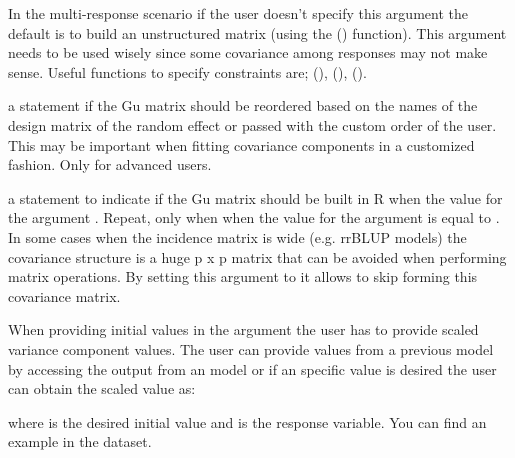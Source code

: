 \documentclass[a4paper]{book}
\begin{document}
\begin{Arguments}
\begin{ldescription}




In the multi-response scenario if the user doesn't specify this argument the default is to build an unstructured matrix (using the () function). This argument needs to be used wisely since some covariance among responses may not make sense. Useful functions to specify constraints are; (), (), ().


\item[\code{reorderGu}] a  statement if the Gu matrix should be reordered based on the names of the design matrix of the random effect or passed with the custom order of the user. This may be important when fitting covariance components in a customized fashion. Only for advanced users.

\item[\code{buildGu}] a  statement to indicate if the Gu matrix should be built in R when the value for the argument . Repeat, only when when the value for the argument  is equal to . In some cases when the incidence matrix is wide (e.g. rrBLUP models) the covariance structure is a huge p x p matrix that can be avoided when performing matrix operations. By setting this argument to  it allows to skip forming this covariance matrix.

\end{ldescription}
\end{Arguments}
%
\begin{Details}\relax
When providing initial values in the  argument the user has to provide scaled variance component values. The user can provide values from a previous model by accessing the  output from an  model or if an specific value is desired the user can obtain the scaled value as:


where  is the desired initial value and  is the response variable. You can find an example in the  dataset.

\end{Details}
\end{document}
